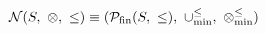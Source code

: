 \[
\mathcal{N}(S,\ \otimes,\ \leq) \equiv (\mathcal{P}_{\mathrm{fin}}(S,\ \leq),\ \minunion,\ \minlift)
\]

